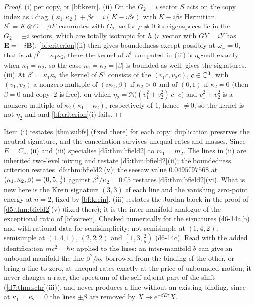 \begin{proof}
(i)  per copy, or \cref{bf:krein}. (ii) On the $G_2=i$ sector $S$ acts on the copy index as
$i\operatorname{diag}(\kappa_1,\kappa_2)+\beta\epsilon=i(K-i\beta\epsilon)$ with $K-i\beta\epsilon$ Hermitian. $S^\dagger=K\otimes G-\beta E$ commutes with
$G_2$, so for $\mu\neq0$ its eigenspaces lie in the $G_2=\pm i$ sectors, which are totally isotropic for $h$ (a vector with $GY=iY$ has
$\mathbf E=-i\mathbf B$); \cref{bf:criterion}(ii) then gives boundedness except possibly at $\omega_-=0$, that is at $\beta^2=\kappa_1\kappa_2$; there the kernel of $S^\dagger$ computed in (iii) is $\eta_2$-null exactly when $\kappa_1=\kappa_2$, so the case $\kappa_1=\kappa_2=|\beta|$ is bounded as well.  gives the signatures. (iii) At
$\beta^2=\kappa_1\kappa_2$ the kernel of $S^\dagger$ consists of the $(v_1c,v_2c)$, $c\in\mathbb{C}^3$, with $(v_1,v_2)$ a nonzero multiple of $(i\kappa_2,\beta)$ if $\kappa_2>0$ and of $(0,1)$ if $\kappa_2=0$ (then $\beta=0$ and copy~$2$ is free), on which
$\eta_2=\Re\bigl((v_1^2+v_2^2)\,c\cdot c\bigr)$ and $v_1^2+v_2^2$ is a nonzero multiple of $\kappa_2(\kappa_1-\kappa_2)$, respectively of $1$, hence $\neq0$; so the kernel is not $\eta_2$-null and
\cref{bf:criterion}(i) fails.
\end{proof}

Item (i) restates \cref{thm:subfs} (fixed there) for each copy: duplication preserves the neutral signature, and the cancellation
survives unequal rates and masses. Since $E=C_v$, (ii) and (iii) specialise \cref{d5:thm:bfield2} to $m_1=m_2$. The lines in (ii) are inherited two-level mixing and restate
\cref{d5:thm:bfield2}(ii); the boundedness criterion restates \cref{d5:thm:bfield2}(v); the seesaw value $0.0495097568$ at
$(\kappa_1,\kappa_2,\beta)=(0,5,\tfrac12)$ against $\beta^2/\kappa_2=0.05$ restates \cref{d5:thm:bfield2}(vi). What is new here is the Krein signature
$(3,3)$ of each line and the vanishing zero-point energy at $n=2$, fixed by \cref{bf:krein}. (iii) restates the Jordan block in the proof
of \cref{d5:thm:bfield2}(v) (fixed there); it is the inter-manifold analogue of the exceptional ratio of \cref{bf:screen}. Checked numerically for the signatures (d6-14a,b) and with rational
data for semisimplicity: not semisimple at $(1,4,2)$, semisimple at $(1,4,1)$, $(2,2,2)$ and $(1,3,\tfrac25)$ (d6-14c). Read with the added
identification $mc^2=\hbar\kappa$ applied to the lines: an inter-manifold $b$ can give an unbound manifold the line $\beta^2/\kappa_2$ borrowed from the
binding of the other, or bring a line to zero, at unequal rates exactly at the price of unbounded motion; it never changes a rate, the spectrum of the
self-adjoint part of the shift (\cref{d7:thm:schr}(iii)), and never produces a line without an existing binding, since at
$\kappa_1=\kappa_2=0$ the lines $\pm\beta$ are removed by $X\mapsto e^{-\beta E\tau}X$.

